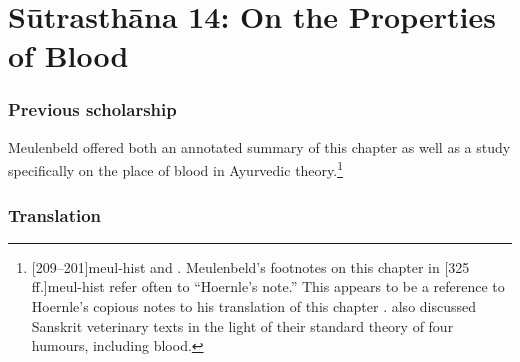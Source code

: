 
\chapter{Sūtrasthāna 14:  On the Properties of Blood}


\subsection{Previous scholarship}

Meulenbeld offered both an annotated summary of this chapter as well as a
study specifically on the place of blood in Ayurvedic
theory.\footnote{[209--201]{meul-hist}  and \cite{meul-1991}.
    Meulenbeld's footnotes on this chapter in
    [325\,ff.]{meul-hist} refer often to ``Hoernle's note.'' 
    This appears to be a reference to Hoernle's copious notes to his
    translation of this chapter \citep[87--98]{hoer-1897}. \citet{meul-1990}
    also discussed Sanskrit veterinary texts in the light of their standard
    theory of four humours, including blood.}

\subsection{Translation}

